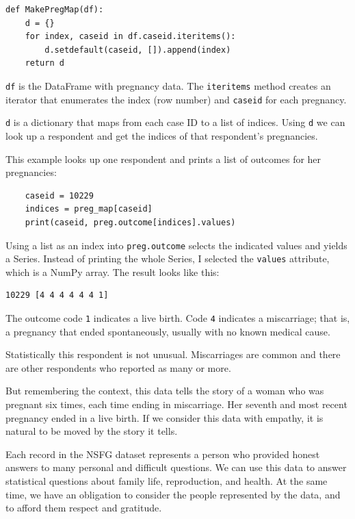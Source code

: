 \documentclass[12pt]{book}
\begin{document}

\begin{verbatim}
def MakePregMap(df):
    d = {}
    for index, caseid in df.caseid.iteritems():
        d.setdefault(caseid, []).append(index)
    return d
\end{verbatim}

{\tt df} is the DataFrame with pregnancy data.  The {\tt iteritems}
method creates an iterator that enumerates the index (row number)
and {\tt caseid} for each pregnancy.

{\tt d} is a dictionary that maps from each case ID to a list of
indices.  Using {\tt d} we can look up a respondent and get the
indices of that respondent's pregnancies.

This example looks up one respondent and prints a list of outcomes
for her pregnancies:

\begin{verbatim}
    caseid = 10229
    indices = preg_map[caseid]
    print(caseid, preg.outcome[indices].values)
\end{verbatim}

Using a list as an index into {\tt preg.outcome} selects the
indicated values and yields a Series.  Instead of printing the
whole Series, I selected the {\tt values} attribute, which is
a NumPy array.  The result looks like this:

\begin{verbatim}
10229 [4 4 4 4 4 4 1]
\end{verbatim}

The outcome code {\tt 1} indicates a live birth. Code {\tt 4} indicates
a miscarriage; that is, a pregnancy that ended spontaneously, usually
with no known medical cause.

Statistically this respondent is not unusual.  Miscarriages are common
and there are other respondents who reported as many or more.

But remembering the context, this data tells the story of a woman who
was pregnant six times, each time ending in miscarriage.  Her seventh
and most recent pregnancy ended in a live birth.  If we consider this
data with empathy, it is natural to be moved by the story it tells.

Each record in the NSFG dataset represents a person who provided
honest answers to many personal and difficult questions.  We can use
this data to answer statistical questions about family life,
reproduction, and health.  At the same time, we have an obligation
to consider the people represented by the data, and to afford them
respect and gratitude.
\end{document}
